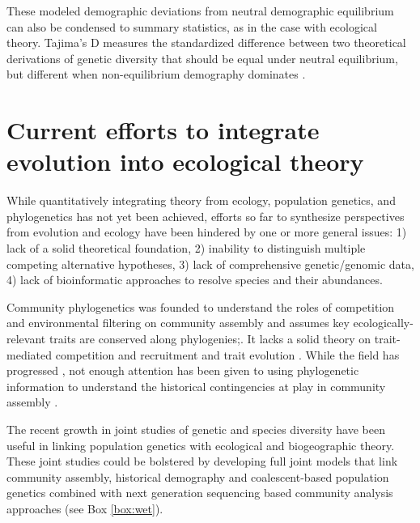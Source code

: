 \documentclass[12pt]{article}
\newcounter{Box}
\begin{document}
These modeled demographic deviations from neutral demographic equilibrium can also be condensed to summary statistics, as in the case with ecological theory. Tajima's D measures the standardized difference between two theoretical derivations of genetic diversity that should be equal under neutral equilibrium, but different when non-equilibrium demography dominates \citep{Tajima1989-mc, Freedman2016-yx, Barton1998-xs, Barton2000-gr, Jensen2005-ef, Schrider2016-cw, Stephan2016-lf, Good2014-fq}.


\section{Current efforts to integrate evolution into ecological theory} \label{sec:toDate}

While quantitatively integrating theory from ecology, population
genetics, and phylogenetics has not yet been achieved, efforts so far
to synthesize perspectives from evolution and ecology have been hindered by one or more general issues:
1) lack of a solid theoretical foundation, 2) inability to distinguish
multiple competing alternative hypotheses, 3) lack of comprehensive
genetic/genomic data, 4) lack of bioinformatic approaches to resolve species
and their abundances. 

Community phylogenetics \citep{Webb2002-yr} was founded to understand
the roles of competition and environmental filtering on community
assembly and  assumes key ecologically-relevant traits are conserved
along phylogenies;. It lacks a solid theory on trait-mediated
competition and recruitment and trait evolution \citep{Losos2008-eq}. While the field has
progressed \citep[e.g.,][]{sukumaran2016}, not enough attention has been
given to using phylogenetic information to understand the historical
contingencies at play in community assembly \citep{Ricklefs2007-wo,
  Emerson2008-as}.

The recent growth in joint studies of genetic and species diversity
\citep{Vanoverbeke2015-ym, Vellend2005-up, Vellend2014-ir,
  Papadopoulou2011-bd} have been useful in linking population genetics
with ecological and biogeographic theory. These joint studies could be bolstered by
developing full joint models that link community assembly, historical
demography and coalescent-based population genetics combined with
next generation sequencing based community analysis approaches (see
Box \ref{box:wet}).
\end{document}
